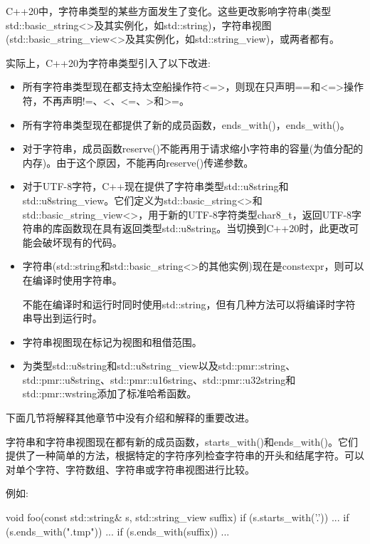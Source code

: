 
C++20中，字符串类型的某些方面发生了变化。这些更改影响字符串(类型std::basic\_string<>及其实例化，如std::string)，字符串视图(std::basic\_string\_view<>及其实例化，如std::string\_view)，或两者都有。

实际上，C++20为字符串类型引入了以下改进:

\begin{itemize}
\item
所有字符串类型现在都支持太空船操作符<=>，则现在只声明==和<=>操作符，不再声明!=、<、<=、>和>=。

\item
所有字符串类型现在都提供了新的成员函数，ends\_with()，ends\_with()。

\item
对于字符串，成员函数reserve()不能再用于请求缩小字符串的容量(为值分配的内存)。由于这个原因，不能再向reserve()传递参数。

\item
对于UTF-8字符，C++现在提供了字符串类型std::u8string和std::u8string\_view。它们定义为std::basic\_string<>和std::basic\_string\_view<>，用于新的UTF-8字符类型char8\_t，返回UTF-8字符串的库函数现在具有返回类型std::u8string。当切换到C++20时，此更改可能会破坏现有的代码。

\item
字符串(std::string和std::basic\_string<>的其他实例)现在是constexpr，则可以在编译时使用字符串。

不能在编译时和运行时同时使用std::string，但有几种方法可以将编译时字符串导出到运行时。

\item
字符串视图现在标记为视图和租借范围。

\item
为类型std::u8string和std::u8string\_view以及std::pmr::string、std::pmr::u8string、std::pmr::u16string、std::pmr::u32string和std::pmr::wstring添加了标准哈希函数。
\end{itemize}

下面几节将解释其他章节中没有介绍和解释的重要改进。


字符串和字符串视图现在都有新的成员函数，starts\_with()和ends\_with()。它们提供了一种简单的方法，根据特定的字符序列检查字符串的开头和结尾字符。可以对单个字符、字符数组、字符串或字符串视图进行比较。

例如:

\begin{cpp}
void foo(const std::string& s, std::string_view suffix)
{
	if (s.starts_with('.')) {
		...
	}
	if (s.ends_with(".tmp")) {
		...
	}
	if (s.ends_with(suffix)) {
		...
	}
}
\end{cpp}

